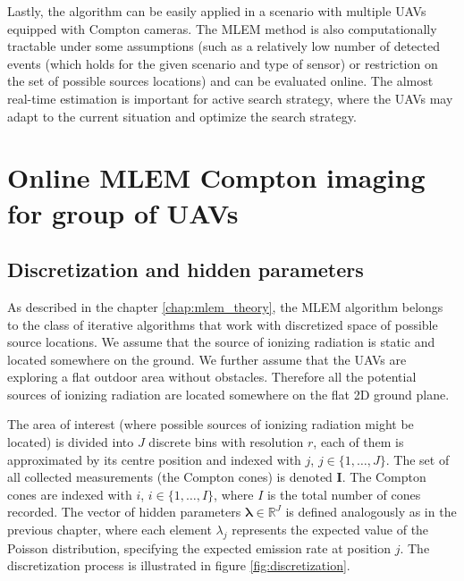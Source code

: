 Lastly, the algorithm can be easily applied in a scenario with multiple \ac{UAV}s equipped with Compton cameras.
The \ac{MLEM} method is also computationally tractable under some assumptions 
(such as a relatively low number of detected events (which holds for the given scenario and type of sensor) or restriction on the set of possible sources locations)
and can be evaluated online.
The almost real-time estimation is important for active search strategy, where the \ac{UAV}s may adapt to the current situation and optimize the search strategy.

\section{Online MLEM Compton imaging for group of \ac{UAV}s}
\label{sec:setup}
\subsection{Discretization and hidden parameters}
As described in the chapter \ref{chap:mlem_theory}, the \ac{MLEM} algorithm belongs to the class of iterative algorithms that work with discretized space of possible source locations.
We assume that the source of ionizing radiation is static and located somewhere on the ground.
We further assume that the \ac{UAV}s are exploring a flat outdoor area without obstacles. Therefore all the potential sources of ionizing radiation are located somewhere on the flat 2D ground plane.

The area of interest (where possible sources of ionizing radiation might be located) is divided into $J$ discrete bins with resolution $r$, each of them is approximated by its centre position and indexed with $j$, $j \in \{1, \dots , J\}$.
The set of all collected measurements (the Compton cones) is denoted $\mathbf{I}$.
The Compton cones are indexed with $i$, $i \in \{1, \dots, I\}$, where $I$ is the total number of cones recorded.
The vector of hidden parameters $\bm{\lambda}\in \mathbb{R}^{J}$ is defined analogously as in the previous chapter, where each element $\lambda_{j}$ represents the expected value of the Poisson distribution, specifying the expected emission rate at position $j$.
The discretization process is illustrated in figure \ref{fig:discretization}.

